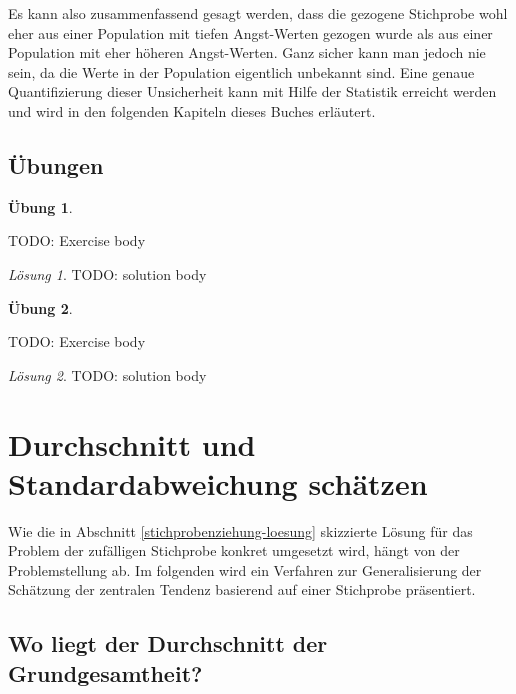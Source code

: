 \documentclass[
]{book}
\theoremstyle{definition}
\theoremstyle{definition}
\theoremstyle{definition}
\newtheorem{exercise}{Übung}[chapter]
\theoremstyle{definition}
\theoremstyle{remark}
\newtheorem*{solution}{Lösung}
\begin{document}
Es kann also zusammenfassend gesagt werden, dass die gezogene Stichprobe wohl eher aus einer Population mit tiefen Angst-Werten gezogen wurde als aus einer Population mit eher höheren Angst-Werten. Ganz sicher kann man jedoch nie sein, da die Werte in der Population eigentlich unbekannt sind. Eine genaue Quantifizierung dieser Unsicherheit kann mit Hilfe der Statistik erreicht werden und wird in den folgenden Kapiteln dieses Buches erläutert.

\section{Übungen}\label{uxfcbungen}

\begin{exercise}
\protect\hypertarget{exr:tagname-alskfdieu}{}\label{exr:tagname-alskfdieu}\leavevmode

TODO: Exercise body

\end{exercise}

\begin{solution}
TODO: solution body
\end{solution}

\begin{exercise}
\protect\hypertarget{exr:tagname-apwioev}{}\label{exr:tagname-apwioev}\leavevmode

TODO: Exercise body

\end{exercise}

\begin{solution}
TODO: solution body
\end{solution}

\chapter{Durchschnitt und Standardabweichung schätzen}\label{durchschnitt-und-standardabweichung-schuxe4tzen}

Wie die in Abschnitt \ref{stichprobenziehung-loesung} skizzierte Lösung für das Problem der zufälligen Stichprobe konkret umgesetzt wird, hängt von der Problemstellung ab. Im folgenden wird ein Verfahren zur Generalisierung der Schätzung der zentralen Tendenz
basierend auf einer Stichprobe präsentiert.

\section{Wo liegt der Durchschnitt der Grundgesamtheit?}\label{wo-liegt-der-durchschnitt-der-grundgesamtheit}
\end{document}
